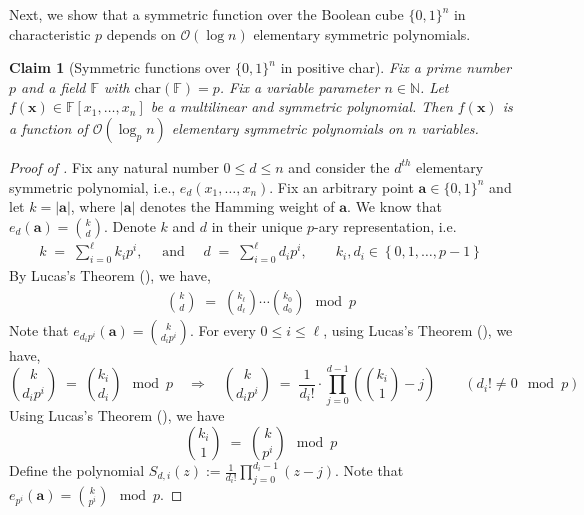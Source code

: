 \documentclass[11pt]{article}
\newtheorem{claim}[theorem]{Claim}
\newcommand{\Boo}{\{0,1 \}}
\newcommand{\bigO}{\mathcal{O}}
\newcommand{\paren}[1]{\left( #1 \right)}
\newcommand{\set}[1]{\left\{ #1 \right\}}
\newcommand{\F}{\mathbb{F}}
\begin{document}
Next, we show that a symmetric function over the Boolean cube $\Boo^{n}$ in characteristic $p$ depends on $\bigO(\log n)$ elementary symmetric polynomials.

\begin{claim}[Symmetric functions over $\Boo^{n}$ in positive char]\label{claim:sym-char-p}
Fix a prime number $p$ and a field $\F$ with $\mathrm{char}(\F) = p$. Fix a variable parameter $n \in \mathbb{N}$.\newline
Let $f(\mathbf{x}) \in \F[x_{1},\ldots, x_{n}]$ be a multilinear and symmetric polynomial. Then $f(\mathbf{x})$ is a function of $\bigO(\log_{p} n)$ elementary symmetric polynomials on $n$ variables.
\end{claim}
\begin{proof}[Proof of ]
Fix any natural number $0 \leq d \leq n$ and consider the $d^{th}$ elementary symmetric polynomial, i.e., $e_{d}(x_{1},\ldots,x_{n})$. Fix an arbitrary point $\mathbf{a} \in \Boo^{n}$ and let $k = |\mathbf{a}|$, where $|\mathbf{a}|$ denotes the Hamming weight of $\mathbf{a}$. We know that $e_{d}(\mathbf{a}) = \binom{k}{d}$.
Denote $k$ and $d$ in their unique $p$-ary representation, i.e.
\begin{align*}
    k \; = \; \sum_{i = 0}^{\ell} k_{i} p^{i}, \quad \text{ and } \quad d \; = \; \sum_{i = 0}^{\ell} d_{i} p^{i}, \quad \quad k_{i}, d_{i} \in \set{0,1,\ldots,p-1}
\end{align*}
By Lucas's Theorem (), we have,
\begin{align*}
    \binom{k}{d} \; = \; \binom{k_{\ell}}{d_{\ell}} \cdots \binom{k_{0}}{d_{0}} \mod{p}
\end{align*}
Note that $e_{d_{i} p^{i}}(\mathbf{a}) = \binom{k}{d_{i} p^{i}}$. For every $0 \leq i \leq \ell$, using Lucas's Theorem (), we have,
\begin{equation}\label{eqn:sym-p-powers-1}
    \binom{k}{d_{i}p^{i}} \; = \; \binom{k_{i}}{d_{i}} \mod{p} \quad \Rightarrow \quad \binom{k}{d_{i}p^{i}} \; = \; \dfrac{1}{d_{i}!} \cdot \prod_{j = 0}^{d-1} \paren{\binom{k_{i}}{1} - j} \quad \quad (d_{i}! \neq 0 \mod{p})
\end{equation}
Using Lucas's Theorem (), we have
\begin{equation}\label{eqn:sym-p-powers-2}
    \binom{k_{i}}{1} \; = \; \binom{k}{p^{i}} \mod{p}
\end{equation}
Define the polynomial $S_{d,i}(z) := \frac{1}{d_i!}\prod_{j = 0}^{d_i-1} \paren{z - j}$. Note that $e_{p^{i}}(\mathbf{a}) = \binom{k}{p^{i}} \mod{p}$.

\end{proof}
\end{document}
